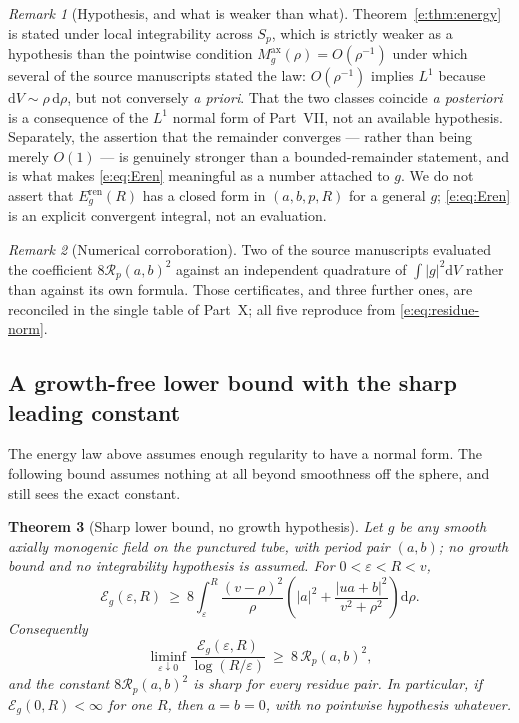 \documentclass[11pt,a4paper]{article}
\numberwithin{equation}{section}
\newtheorem{theorem}{Theorem}[section]
\theoremstyle{definition}
\theoremstyle{remark}
\newtheorem{remark}[theorem]{Remark}
\theoremstyle{plain}
\newcommand{\Sp}{S_{p}}
\newcommand{\Rp}{\mathcal R_{p}}      %
\newcommand{\Max}{M^{\mathrm{ax}}}                    %
\newcommand{\Eg}{\mathcal E_{g}}
\newcommand{\Eren}{E^{\mathrm{ren}}}
\newcommand{\abs}[1]{\lvert #1\rvert}
\newcommand{\dd}{\mathrm d}
\begin{document}
\begin{remark}[Hypothesis, and what is weaker than what]
\label{e:rem:energy-hyp}
Theorem~\ref{e:thm:energy} is stated under local integrability across
$\Sp$, which is strictly weaker as a hypothesis than the pointwise
condition $\Max_g(\rho)=O(\rho^{-1})$ under which several of the source
manuscripts stated the law: $O(\rho^{-1})$ implies $L^1$ because
$\dd V\sim\rho\,\dd\rho$, but not conversely \emph{a priori}. That the
two classes coincide \emph{a posteriori} is a consequence of the $L^1$
normal form of Part~VII, not an available hypothesis. Separately, the
assertion that the remainder converges --- rather than being merely
$O(1)$ --- is genuinely stronger than a bounded-remainder statement, and
is what makes \eqref{e:eq:Eren} meaningful as a number attached to $g$.
We do not assert that $\Eren_g(R)$ has a closed form in $(a,b,p,R)$ for a
general $g$; \eqref{e:eq:Eren} is an explicit convergent integral, not an
evaluation.
\end{remark}

\begin{remark}[Numerical corroboration]
Two of the source manuscripts evaluated the coefficient
$8\Rp(a,b)^2$ against an independent quadrature of
$\int\abs g^2\dd V$ rather than against its own formula. Those
certificates, and three further ones, are reconciled in the single table
of Part~X; all five reproduce from \eqref{e:eq:residue-norm}.
\end{remark}

\subsection{A growth-free lower bound with the sharp leading constant}
\label{e:sec:lowerbound}

The energy law above assumes enough regularity to have a normal form. The
following bound assumes nothing at all beyond smoothness off the sphere,
and still sees the exact constant.

\begin{theorem}[Sharp lower bound, no growth hypothesis]
\label{e:thm:lowerenergy}
Let $g$ be any smooth axially monogenic field on the punctured tube, with
period pair $(a,b)$; no growth bound and no integrability hypothesis is
assumed. For $0<\varepsilon<R<v$,
\begin{equation}
 \Eg(\varepsilon,R)\ \ge\
 8\int_\varepsilon^R\frac{(v-\rho)^2}{\rho}
 \left(\abs a^2+\frac{\abs{ua+b}^2}{v^2+\rho^2}\right)\dd\rho .
 \label{e:eq:lowerenergy}
\end{equation}
Consequently
\begin{equation}
 \liminf_{\varepsilon\downarrow0}
 \frac{\Eg(\varepsilon,R)}{\log(R/\varepsilon)}\ \ge\ 8\,\Rp(a,b)^2,
 \label{e:eq:liminf}
\end{equation}
and the constant $8\Rp(a,b)^2$ is sharp for every residue pair. In
particular, if $\Eg(0,R)<\infty$ for one $R$, then $a=b=0$, with no
pointwise hypothesis whatever.
\end{theorem}
\end{document}

